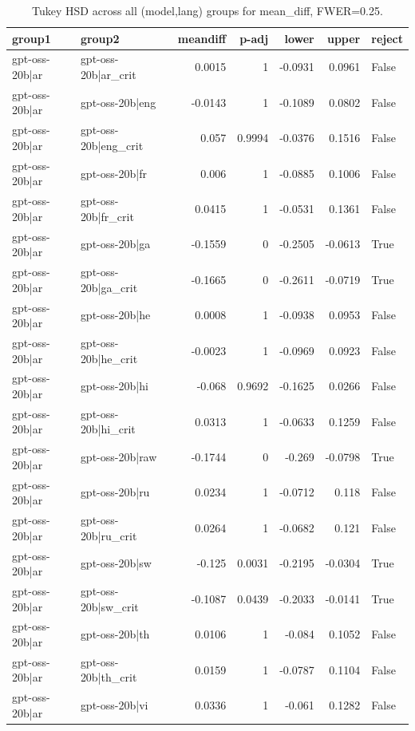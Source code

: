 \begin{table}
\caption{Tukey HSD across all (model,lang) groups for mean_diff, FWER=0.25.}
\label{tab:tukey_all_models_all_langs_mean_diff}
\begin{tabular}{l l r r r r l}
\toprule
group1 & group2 & meandiff & p-adj & lower & upper & reject \\
\midrule
gpt-oss-20b|ar & gpt-oss-20b|ar_crit & 0.0015 & 1 & -0.0931 & 0.0961 & False \\
gpt-oss-20b|ar & gpt-oss-20b|eng & -0.0143 & 1 & -0.1089 & 0.0802 & False \\
gpt-oss-20b|ar & gpt-oss-20b|eng_crit & 0.057 & 0.9994 & -0.0376 & 0.1516 & False \\
gpt-oss-20b|ar & gpt-oss-20b|fr & 0.006 & 1 & -0.0885 & 0.1006 & False \\
gpt-oss-20b|ar & gpt-oss-20b|fr_crit & 0.0415 & 1 & -0.0531 & 0.1361 & False \\
gpt-oss-20b|ar & gpt-oss-20b|ga & -0.1559 & 0 & -0.2505 & -0.0613 & True \\
gpt-oss-20b|ar & gpt-oss-20b|ga_crit & -0.1665 & 0 & -0.2611 & -0.0719 & True \\
gpt-oss-20b|ar & gpt-oss-20b|he & 0.0008 & 1 & -0.0938 & 0.0953 & False \\
gpt-oss-20b|ar & gpt-oss-20b|he_crit & -0.0023 & 1 & -0.0969 & 0.0923 & False \\
gpt-oss-20b|ar & gpt-oss-20b|hi & -0.068 & 0.9692 & -0.1625 & 0.0266 & False \\
gpt-oss-20b|ar & gpt-oss-20b|hi_crit & 0.0313 & 1 & -0.0633 & 0.1259 & False \\
gpt-oss-20b|ar & gpt-oss-20b|raw & -0.1744 & 0 & -0.269 & -0.0798 & True \\
gpt-oss-20b|ar & gpt-oss-20b|ru & 0.0234 & 1 & -0.0712 & 0.118 & False \\
gpt-oss-20b|ar & gpt-oss-20b|ru_crit & 0.0264 & 1 & -0.0682 & 0.121 & False \\
gpt-oss-20b|ar & gpt-oss-20b|sw & -0.125 & 0.0031 & -0.2195 & -0.0304 & True \\
gpt-oss-20b|ar & gpt-oss-20b|sw_crit & -0.1087 & 0.0439 & -0.2033 & -0.0141 & True \\
gpt-oss-20b|ar & gpt-oss-20b|th & 0.0106 & 1 & -0.084 & 0.1052 & False \\
gpt-oss-20b|ar & gpt-oss-20b|th_crit & 0.0159 & 1 & -0.0787 & 0.1104 & False \\
gpt-oss-20b|ar & gpt-oss-20b|vi & 0.0336 & 1 & -0.061 & 0.1282 & False \\

\end{tabular}
\end{table}
